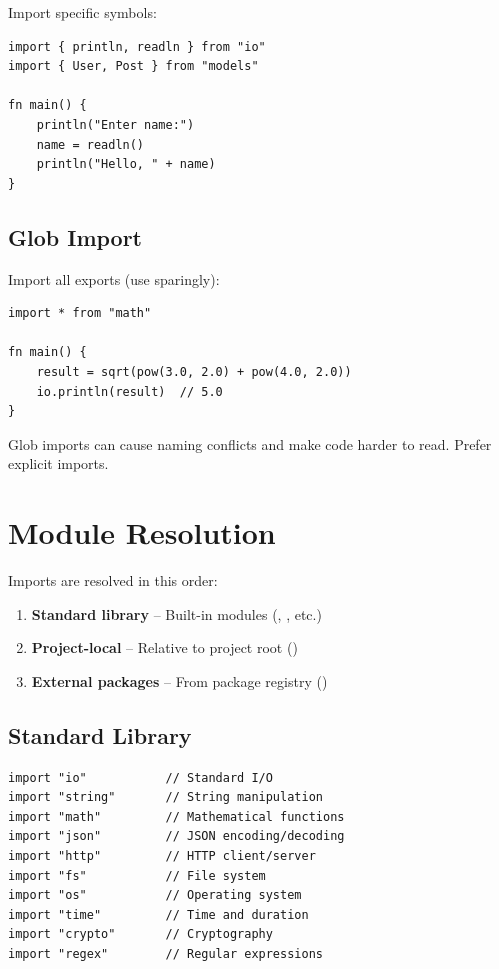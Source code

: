 Import specific symbols:

\begin{lstlisting}
import { println, readln } from "io"
import { User, Post } from "models"

fn main() {
    println("Enter name:")
    name = readln()
    println("Hello, " + name)
}
\end{lstlisting}

\subsection{Glob Import}

Import all exports (use sparingly):

\begin{lstlisting}
import * from "math"

fn main() {
    result = sqrt(pow(3.0, 2.0) + pow(4.0, 2.0))
    io.println(result)  // 5.0
}
\end{lstlisting}

\begin{warning}
Glob imports can cause naming conflicts and make code harder to read. Prefer explicit imports.
\end{warning}

\section{Module Resolution}

Imports are resolved in this order:

\begin{enumerate}
    \item \textbf{Standard library} -- Built-in modules (, , etc.)
    \item \textbf{Project-local} -- Relative to project root ()
    \item \textbf{External packages} -- From package registry ()
\end{enumerate}

\subsection{Standard Library}

\begin{lstlisting}
import "io"           // Standard I/O
import "string"       // String manipulation
import "math"         // Mathematical functions
import "json"         // JSON encoding/decoding
import "http"         // HTTP client/server
import "fs"           // File system
import "os"           // Operating system
import "time"         // Time and duration
import "crypto"       // Cryptography
import "regex"        // Regular expressions
\end{lstlisting}

